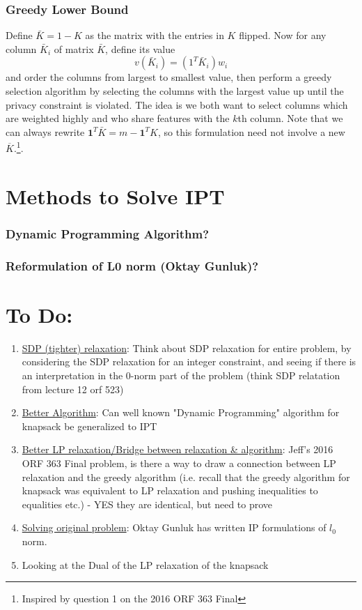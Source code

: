 \documentclass[12pt]{article}
\begin{document}
\subsubsection{Greedy Lower Bound}
    Define $\bar{K} = 1 - K$ as the matrix with the entries in $K$ flipped. Now for any column $\bar{K}_i$ of matrix $\bar{K}$, define its value \[v(\bar{K}_i) = (1^T \bar{K}_i) w_i\] and order the columns from largest to smallest value, then perform a greedy selection algorithm by selecting the columns with the largest value up until the privacy constraint is violated. The idea is we both want to select columns which are weighted highly and who share features with the $k$th column.  Note that we can always rewrite $\mathbf{1}^T\bar{K} = m - \mathbf{1}^TK$, so this formulation need not involve a new $\overline{K}$.\footnote{Inspired by question 1 on the 2016 ORF 363 Final}.
    

\section{Methods to Solve \gls{IPT}}
\subsubsection{Dynamic Programming Algorithm?}
\subsubsection{Reformulation of L0 norm (Oktay Gunluk)?}
\section*{To Do:}
\begin{enumerate}
    \item \underline{SDP (tighter) relaxation}: Think about SDP relaxation for entire problem, by considering the SDP relaxation for an integer constraint, and seeing if there is an interpretation in the 0-norm part of the problem (think SDP relatation from lecture 12 orf 523)
    \item \underline{Better Algorithm}: Can well known "Dynamic Programming" algorithm for knapsack be generalized to \gls{IPT}
    \item \underline{Better LP relaxation/Bridge between relaxation \& algorithm}: Jeff's 2016 ORF 363 Final problem, is there a way to draw a connection between LP relaxation and the greedy algorithm (i.e. recall that the greedy algorithm for knapsack was equivalent to LP relaxation and pushing inequalities to equalities etc.) - YES they are identical, but need to prove
    \item \underline{Solving original problem}: Oktay Gunluk has written IP formulations of $l_0$ norm.
    \item Looking at the Dual of the LP relaxation of the knapsack
\end{enumerate}


\end{document}
